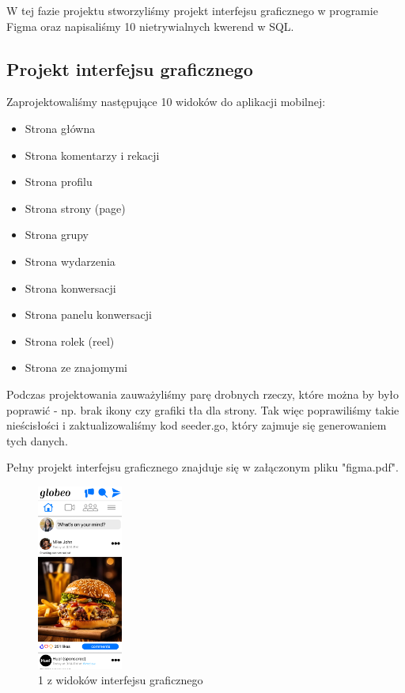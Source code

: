\documentclass{article}
\begin{document}
\quad W tej fazie projektu stworzyliśmy projekt interfejsu graficznego w programie Figma oraz napisaliśmy 10 nietrywialnych kwerend w SQL.

\subsection{Projekt interfejsu graficznego}
\quad Zaprojektowaliśmy następujące 10 widoków do aplikacji mobilnej:

\begin{itemize}
    \item Strona główna
    \item Strona komentarzy i rekacji
    \item Strona profilu
    \item Strona strony (page)
    \item Strona grupy
    \item Strona wydarzenia
    \item Strona konwersacji
    \item Strona panelu konwersacji
    \item Strona rolek (reel)
    \item Strona ze znajomymi
\end{itemize}

\quad Podczas projektowania zauważyliśmy parę drobnych rzeczy, które można by było poprawić - np. brak ikony czy grafiki tła dla strony. Tak więc poprawiliśmy takie nieścisłości i zaktualizowaliśmy kod seeder.go, który zajmuje się generowaniem tych danych.

\quad Pełny projekt interfejsu graficznego znajduje się w załączonym pliku "figma.pdf".

\begin{figure}[H]
    \centering
    \includegraphics[width=0.25\textwidth]{images/figma.png}
    \caption{1 z widoków interfejsu graficznego}
    \label{fig:figma}
\end{figure}
\end{document}

